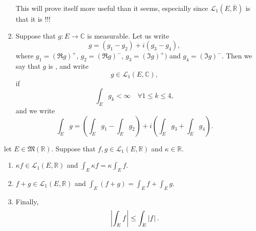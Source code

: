 \documentclass[notoc,notitlepage]{tufte-book}
\begin{document}
\begin{remark}
\begin{enumerate}
      This will prove itself more useful than it seems, especially since
      $\mathcal{L}_1(E, \overline{\mathbb{R}})$ is that it is !!!
    \item Suppose that $g : E \to \mathbb{C}$ is measurable. Let us write
      \begin{equation*}
        g = (g_1 - g_2) + i(g_3 - g_4),
      \end{equation*}
      where $g_1 = (\Re g)^+$, $g_2 = (\Re g)^-$, $g_3 = (\Im g)^+)$ and $g_4 =
      (\Im g)^-$. Then we say that $g$ is , and
      write
      \begin{equation*}
        g \in \mathcal{L}_1(E, \mathbb{C}),
      \end{equation*}
      if
      \begin{equation*}
        \int_{E} g_k < \infty \quad \forall 1 \leq k \leq 4,
      \end{equation*}
      and we write
      \begin{equation*}
        \int_{E} g = \left(\int_{E} g_1 - \int_{E} g_2 \right) + i \left(
        \int_{E} g_3 + \int_{E} g_4 \right).
      \end{equation*}
  \end{enumerate}
\end{remark}

\begin{propo}\label{propo:linearity_of_lebesgue_integral_for_lebesgue_integrable_functions}
  let $E \in \mathfrak{M}(\mathbb{R})$. Suppose that $f, g \in \mathcal{L}_1(E,
  \mathbb{R})$ and $\kappa \in \mathbb{R}$.
  \begin{enumerate}
    \item $\kappa f \in \mathcal{L}_1(E, \mathbb{R})$ and $\int_{E} \kappa f =
      \kappa \int_{E} f$.
    \item $f + g \in \mathcal{L}_1(E, \mathbb{R})$ and $\int_{E} (f + g) =
      \int_{E} f + \int_{E} g$.
    \item Finally,
      \begin{equation*}
        \left| \int_{E} f \right| \leq \int_{E} \left|f\right|.
      \end{equation*}
  \end{enumerate}
\end{propo}
\end{document}
